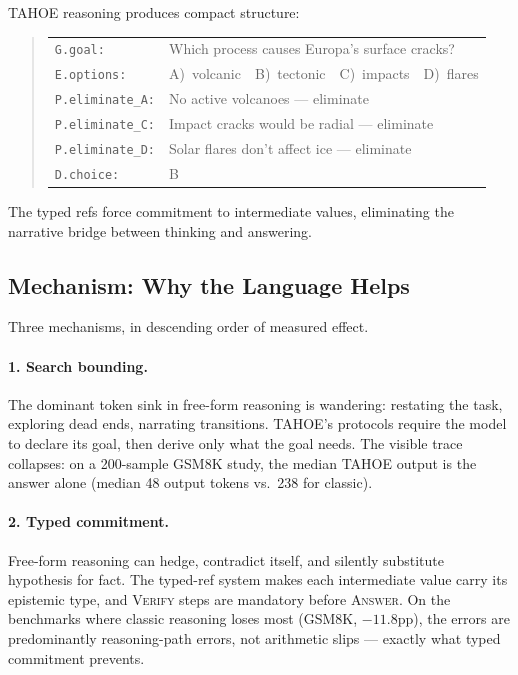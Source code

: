 \documentclass[11pt,a4paper]{article}
\begin{document}
TAHOE reasoning produces compact structure:
\begin{quote}
\small
\begin{tabular}{ll}
\texttt{G.goal:} & Which process causes Europa's surface cracks? \\
\texttt{E.options:} & A)~volcanic~~B)~tectonic~~C)~impacts~~D)~flares \\
\texttt{P.eliminate\_A:} & No active volcanoes --- eliminate \\
\texttt{P.eliminate\_C:} & Impact cracks would be radial --- eliminate \\
\texttt{P.eliminate\_D:} & Solar flares don't affect ice --- eliminate \\
\texttt{D.choice:} & B \\
\end{tabular}
\end{quote}

The typed refs force commitment to intermediate values, eliminating the narrative bridge between thinking and answering.

\subsection{Mechanism: Why the Language Helps}
\label{subsec:mechanism}

Three mechanisms, in descending order of measured effect.

\paragraph{1. Search bounding.}
The dominant token sink in free-form reasoning is wandering: restating the task, exploring dead ends, narrating transitions. TAHOE's protocols require the model to declare its goal, then derive only what the goal needs. The visible trace collapses: on a 200-sample GSM8K study, the median TAHOE output is the answer alone (median 48 output tokens vs.\ 238 for classic).

\paragraph{2. Typed commitment.}
Free-form reasoning can hedge, contradict itself, and silently substitute hypothesis for fact. The typed-ref system makes each intermediate value carry its epistemic type, and \textsc{Verify} steps are mandatory before \textsc{Answer}. On the benchmarks where classic reasoning loses most (GSM8K, $-11.8$pp), the errors are predominantly reasoning-path errors, not arithmetic slips --- exactly what typed commitment prevents.
\end{document}
